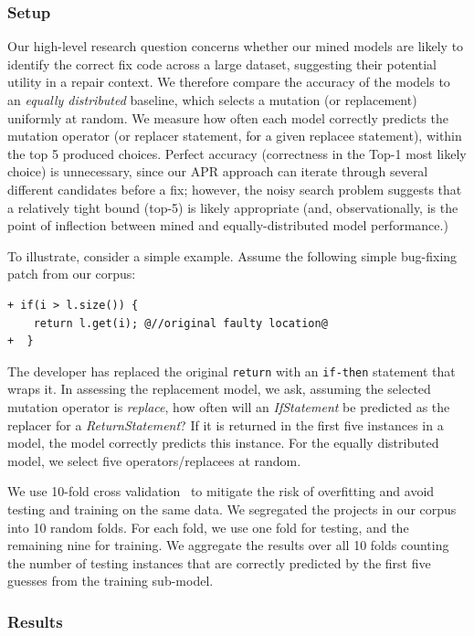 \documentclass[conference]{IEEEtran}
\begin{document}
\subsubsection{Setup}
Our high-level research question concerns whether 
our mined models are likely to identify the correct fix code across a large
dataset, suggesting their potential utility in a repair context.  We therefore
compare the accuracy of the models to an \emph{equally distributed} baseline,
which selects a mutation (or replacement) uniformly at random. 
We measure how often each model correctly predicts the mutation operator (or
replacer statement, for a given replacee statement), within the top 5 produced
choices. Perfect accuracy (correctness in the Top-1 most likely choice) is
unnecessary, since our APR approach can iterate through several
different candidates before a fix; 
however, the noisy search problem suggests that a relatively tight bound (top-5)
is likely appropriate (and, observationally, is the point of inflection between
mined and equally-distributed model performance.)

To illustrate, consider a simple example. Assume the following
simple bug-fixing patch from our corpus: 

\begin{lstlisting}[frame=single]
+ if(i > l.size()) {
    return l.get(i); @//original faulty location@
+  }    
\end{lstlisting}

The developer has replaced the original \texttt{return} with an
\texttt{if-then} statement that wraps it.  In assessing the replacement model,
we ask, assuming the selected mutation operator 
is \emph{replace}, how often will an \emph{IfStatement} be predicted as the
replacer for a \emph{ReturnStatement}? If it is returned in the first five
instances in a model, the model correctly predicts this instance.  For the
equally distributed model, we select five operators/replacees at random. 

We use 10-fold cross validation~\cite{kohavi95} to mitigate the risk
of overfitting and avoid testing and training on the same data.  We segregated
the projects in our corpus into 10 random folds. For each fold, we use one fold
for testing, and the remaining nine for training. We aggregate the results over
all 10 folds counting the number of testing instances that are correctly
predicted by the first five guesses from the training sub-model.

\subsubsection{Results} 
\end{document}

